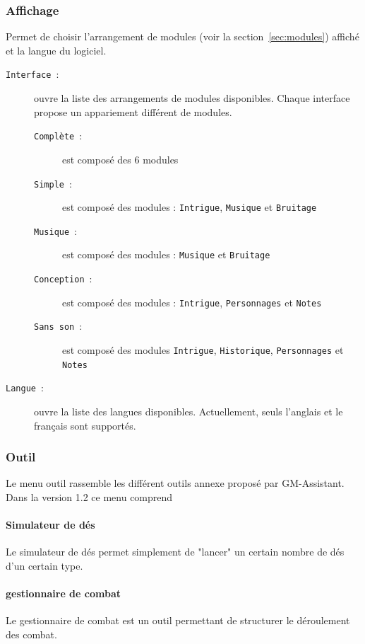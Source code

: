 \documentclass[a4paper,12pt]{article}
\newcommand*{\GMA}{GM-Assistant\xspace}
\newcommand*{\interfaceitem}[1]{\texttt{#1}}
\begin{document}
\subsubsection{Affichage}
Permet de choisir l'arrangement de modules (voir la section~\ref{sec:modules}) affiché et la langue du logiciel.
\begin{description}
    \item[\interfaceitem{Interface}~:]{ouvre la liste des arrangements de modules disponibles.
        Chaque interface propose un appariement différent de modules.}
\begin{description}
  \item[\interfaceitem{Complète}~:]{est composé des 6 modules}
  \item[\interfaceitem{Simple}~:]{est composé des modules : \interfaceitem{Intrigue}, \interfaceitem{Musique} et \interfaceitem{Bruitage}}
  \item[\interfaceitem{Musique}~:]{est composé des modules : \interfaceitem{Musique} et \interfaceitem{Bruitage}}
  \item[\interfaceitem{Conception}~:]{est composé des modules : \interfaceitem{Intrigue}, \interfaceitem{Personnages} et \interfaceitem{Notes}}
  \item[\interfaceitem{Sans son}~:]{est composé des modules \interfaceitem{Intrigue}, \interfaceitem{Historique}, \interfaceitem{Personnages} et \interfaceitem{Notes}}
\end{description}
    \item[\interfaceitem{Langue}~:]{ouvre la liste des langues disponibles.
        Actuellement, seuls l'anglais et le français sont supportés.}
\end{description}

\subsubsection{Outil}
Le menu outil rassemble les différent outils annexe proposé par \GMA.
Dans la version 1.2 ce menu comprend

\paragraph{Simulateur de dés}
Le simulateur de dés permet simplement de "lancer" un certain nombre de dés d'un certain type.

\paragraph{gestionnaire de combat}
Le gestionnaire de combat est un outil permettant de structurer le déroulement des combat.
\end{document}
